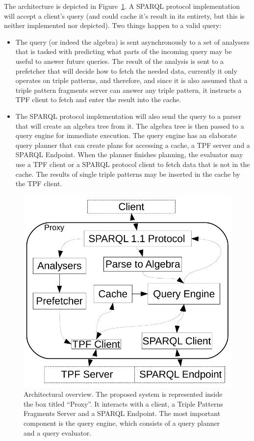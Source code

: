 The architecture is depicted in Figure~\ref{fig:arch}. A SPARQL
protocol implementation will accept a client's query (and could cache
it's result in its entirety, but this is neither implemented nor
depicted). Two things happen to a valid query:

\begin{itemize}
\item The query (or indeed the algebra) is sent asynchronously to a
  set of analysers that is tasked with predicting what parts of the
  incoming query may be useful to answer future queries. The result of
  the analysis is sent to a prefetcher that will decide how to fetch
  the needed data, currently it only operates on triple patterns, and
  therefore, and since it is also assumed that a triple pattern
  fragments server can answer any triple pattern, it instructs a TPF
  client to fetch and enter the result into the cache.  
\item The SPARQL protocol implementation will also send the query to
  a parser that will create an algebra tree from it. The algebra tree
  is then passed to a query engine for immediate execution. The query
  engine has an elaborate query planner that can create plans for
  accessing a cache, a TPF server and a SPARQL Endpoint. When the
  planner finishes planning, the evaluator may use a TPF client or a
  SPARQL protocol client to fetch data that is not in the cache. The
  results of single triple patterns may be inserted in the cache by
  the TPF client.
\end{itemize}

\begin{figure}[h!]
\begin{center}
\includegraphics{architecture.pdf}
\caption{Architectural overview. The proposed system is represented
  inside the box titled ``Proxy''. It interacts with a client, a
  Triple Patterns Fragments Server and a SPARQL Endpoint. The most
  important component is the query engine, which consists of a query
  planner and a query evaluator.}\label{fig:arch}
\end{center}
\end{figure}


